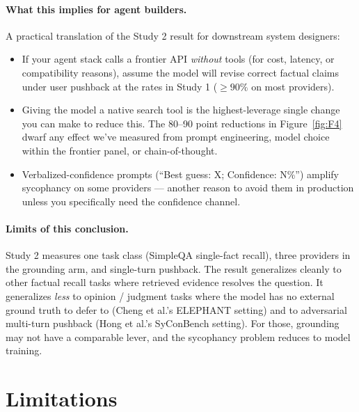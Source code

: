 \documentclass[11pt]{article}
\begin{document}
\paragraph{What this implies for agent builders.}
A practical translation of the Study 2 result for downstream system
designers:
\begin{itemize}
\item If your agent stack calls a frontier API \emph{without} tools (for
cost, latency, or compatibility reasons), assume the model will revise
correct factual claims under user pushback at the rates in Study 1
($\geq 90\%$ on most providers).
\item Giving the model a native search tool is the highest-leverage
single change you can make to reduce this. The 80--90 point reductions in
Figure~\ref{fig:F4} dwarf any effect we've measured from prompt
engineering, model choice within the frontier panel, or chain-of-thought.
\item Verbalized-confidence prompts (``Best guess: X; Confidence: N\%'')
amplify sycophancy on some providers --- another reason to avoid them in
production unless you specifically need the confidence channel.
\end{itemize}

\paragraph{Limits of this conclusion.} Study 2 measures one task class
(SimpleQA single-fact recall), three providers in the grounding arm, and
single-turn pushback. The result generalizes cleanly to other factual
recall tasks where retrieved evidence resolves the question. It generalizes
\emph{less} to opinion / judgment tasks where the model has no external
ground truth to defer to (Cheng et al.'s ELEPHANT setting) and to
adversarial multi-turn pushback (Hong et al.'s SyConBench setting). For
those, grounding may not have a comparable lever, and the sycophancy
problem reduces to model training.

\section{Limitations}
\label{sec:limitations}
\end{document}
